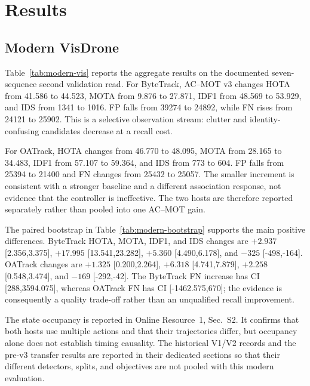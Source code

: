 \section{Results}
\subsection{Modern VisDrone}
Table~\ref{tab:modern-vis} reports the aggregate results on the documented
seven-sequence second validation read. For ByteTrack, AC--MOT v3 changes HOTA
from 41.586 to 44.523, MOTA from 9.876 to 27.871, IDF1 from 48.569 to
53.929, and IDS from 1341 to 1016. FP falls from 39274 to 24892, while FN
rises from 24121 to 25902. This is a selective observation stream: clutter and
identity-confusing candidates decrease at a recall cost.

For OATrack, HOTA changes from 46.770 to 48.095, MOTA from 28.165 to 34.483,
IDF1 from 57.107 to 59.364, and IDS from 773 to 604. FP falls from 25394 to
21400 and FN changes from 25432 to 25057. The smaller increment is consistent
with a stronger baseline and a different association response, not evidence
that the controller is ineffective. The two hosts are therefore reported
separately rather than pooled into one AC--MOT gain.

The paired bootstrap in Table~\ref{tab:modern-bootstrap} supports the main
positive differences. ByteTrack HOTA, MOTA, IDF1, and IDS changes are
$+2.937$ [2.356,3.375], $+17.995$ [13.541,23.282], $+5.360$
[4.490,6.178], and $-325$ [-498,-164]. OATrack changes are $+1.325$
[0.200,2.264], $+6.318$ [4.741,7.879], $+2.258$ [0.548,3.474], and
$-169$ [-292,-42]. The ByteTrack FN increase has CI [288,3594.075], whereas
OATrack FN has CI [-1462.575,670]; the evidence is consequently a quality
trade-off rather than an unqualified recall improvement.

The state occupancy is reported in Online Resource~1, Sec.~S2. It confirms
that both hosts use multiple actions and that their trajectories differ, but
occupancy alone does not establish timing causality. The historical V1/V2
records and the pre-v3 transfer results are reported in their dedicated
sections so that their different detectors, splits, and objectives are not
pooled with this modern evaluation.
